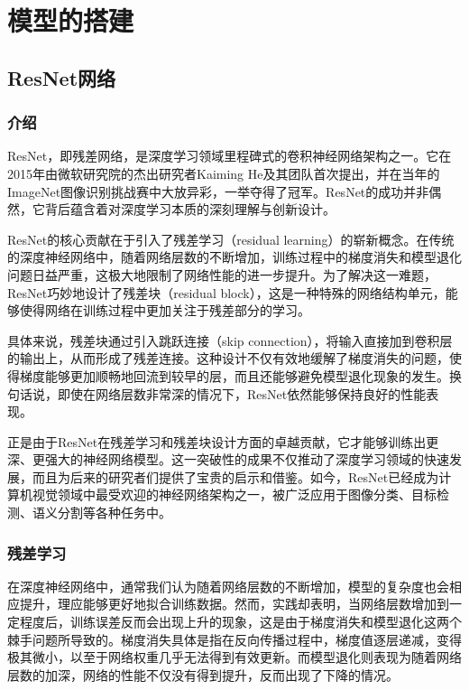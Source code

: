 \chapter{模型的搭建}
\label{chapter:4}

\section{ResNet网络}

\subsection{介绍}

ResNet\cite{He_2016_CVPR}，即残差网络，是深度学习领域里程碑式的卷积神经网络架构之一。它在2015年由微软研究院的杰出研究者Kaiming He及其团队首次提出，并在当年的ImageNet图像识别挑战赛中大放异彩，一举夺得了冠军。ResNet的成功并非偶然，它背后蕴含着对深度学习本质的深刻理解与创新设计。

ResNet的核心贡献在于引入了残差学习（residual learning）的崭新概念。在传统的深度神经网络中，随着网络层数的不断增加，训练过程中的梯度消失和模型退化问题日益严重，这极大地限制了网络性能的进一步提升。为了解决这一难题，ResNet巧妙地设计了残差块（residual block），这是一种特殊的网络结构单元，能够使得网络在训练过程中更加关注于残差部分的学习。

具体来说，残差块通过引入跳跃连接（skip connection），将输入直接加到卷积层的输出上，从而形成了残差连接。这种设计不仅有效地缓解了梯度消失的问题，使得梯度能够更加顺畅地回流到较早的层，而且还能够避免模型退化现象的发生。换句话说，即使在网络层数非常深的情况下，ResNet依然能够保持良好的性能表现。

正是由于ResNet在残差学习和残差块设计方面的卓越贡献，它才能够训练出更深、更强大的神经网络模型。这一突破性的成果不仅推动了深度学习领域的快速发展，而且为后来的研究者们提供了宝贵的启示和借鉴。如今，ResNet已经成为计算机视觉领域中最受欢迎的神经网络架构之一，被广泛应用于图像分类、目标检测、语义分割等各种任务中。

\subsection{残差学习}

在深度神经网络中，通常我们认为随着网络层数的不断增加，模型的复杂度也会相应提升，理应能够更好地拟合训练数据。然而，实践却表明，当网络层数增加到一定程度后，训练误差反而会出现上升的现象，这是由于梯度消失和模型退化这两个棘手问题所导致的。梯度消失具体是指在反向传播过程中，梯度值逐层递减，变得极其微小，以至于网络权重几乎无法得到有效更新。而模型退化则表现为随着网络层数的加深，网络的性能不仅没有得到提升，反而出现了下降的情况。

